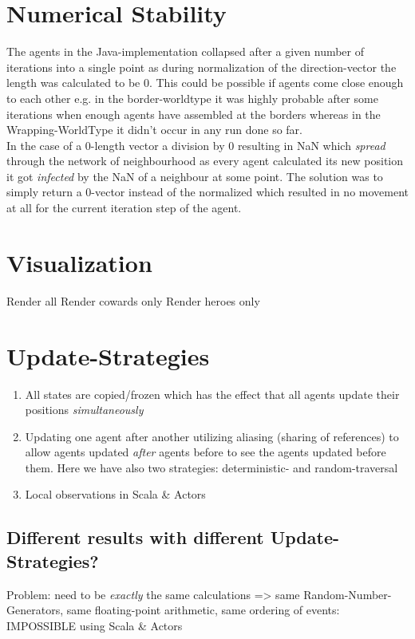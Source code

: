 \section{Numerical Stability}
The agents in the Java-implementation collapsed after a given number of iterations into a single point as during normalization of the direction-vector the length was calculated to be 0. This could be possible if agents come close enough to each other e.g. in the border-worldtype it was highly probable after some iterations when enough agents have assembled at the borders whereas in the Wrapping-WorldType it didn't occur in any run done so far. \\
In the case of a 0-length vector a division by 0  resulting in NaN which \textit{spread} through the network of neighbourhood as every agent calculated its new position it got \textit{infected} by the NaN of a neighbour at some point. The solution was to simply return a 0-vector instead of the normalized which resulted in no movement at all for the current iteration step of the agent. 

\section{Visualization}
Render all
Render cowards only
Render heroes only

\section{Update-Strategies}
\begin{enumerate}
\item All states are copied/frozen which has the effect that all agents update their positions \textit{simultaneously}
\item Updating one agent after another utilizing aliasing (sharing of references) to allow agents updated \textit{after} agents before to see the agents updated before them. Here we have also two strategies: deterministic- and random-traversal
\item Local observations in Scala \& Actors
\end{enumerate}

\subsection{Different results with different Update-Strategies?}
Problem: need to be \textit{exactly} the same calculations => same Random-Number-Generators, same floating-point arithmetic, same ordering of events: IMPOSSIBLE using Scala \& Actors 

